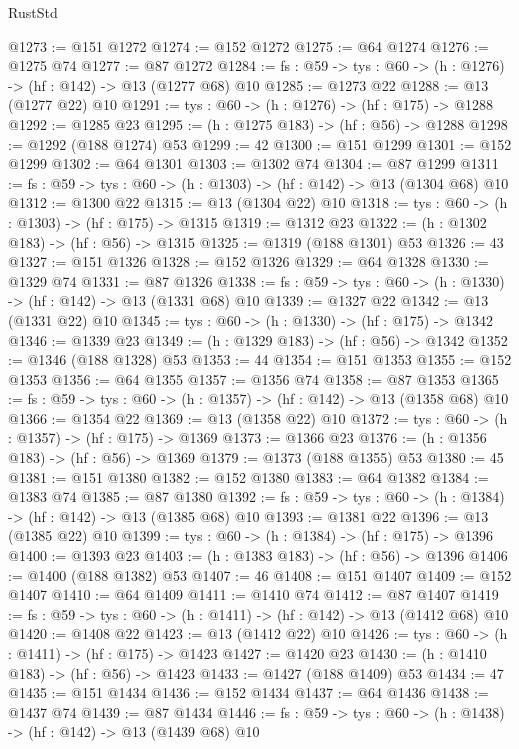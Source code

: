 \begin{lexlean}{RustStd}
\begin{coremodule}
@1273 := @151 @1272
@1274 := @152 @1272
@1275 := @64 @1274
@1276 := @1275 @74
@1277 := @87 @1272
@1284 := {fs : @59} -> {tys : @60} -> (h : @1276) -> (hf : @142) -> @13 (@1277 @68) @10
@1285 := @1273 @22
@1288 := @13 (@1277 @22) @10
@1291 := {tys : @60} -> (h : @1276) -> (hf : @175) -> @1288
@1292 := @1285 @23
@1295 := (h : @1275 @183) -> (hf : @56) -> @1288
@1298 := @1292 (@188 @1274) @53
@1299 := 42
@1300 := @151 @1299
@1301 := @152 @1299
@1302 := @64 @1301
@1303 := @1302 @74
@1304 := @87 @1299
@1311 := {fs : @59} -> {tys : @60} -> (h : @1303) -> (hf : @142) -> @13 (@1304 @68) @10
@1312 := @1300 @22
@1315 := @13 (@1304 @22) @10
@1318 := {tys : @60} -> (h : @1303) -> (hf : @175) -> @1315
@1319 := @1312 @23
@1322 := (h : @1302 @183) -> (hf : @56) -> @1315
@1325 := @1319 (@188 @1301) @53
@1326 := 43
@1327 := @151 @1326
@1328 := @152 @1326
@1329 := @64 @1328
@1330 := @1329 @74
@1331 := @87 @1326
@1338 := {fs : @59} -> {tys : @60} -> (h : @1330) -> (hf : @142) -> @13 (@1331 @68) @10
@1339 := @1327 @22
@1342 := @13 (@1331 @22) @10
@1345 := {tys : @60} -> (h : @1330) -> (hf : @175) -> @1342
@1346 := @1339 @23
@1349 := (h : @1329 @183) -> (hf : @56) -> @1342
@1352 := @1346 (@188 @1328) @53
@1353 := 44
@1354 := @151 @1353
@1355 := @152 @1353
@1356 := @64 @1355
@1357 := @1356 @74
@1358 := @87 @1353
@1365 := {fs : @59} -> {tys : @60} -> (h : @1357) -> (hf : @142) -> @13 (@1358 @68) @10
@1366 := @1354 @22
@1369 := @13 (@1358 @22) @10
@1372 := {tys : @60} -> (h : @1357) -> (hf : @175) -> @1369
@1373 := @1366 @23
@1376 := (h : @1356 @183) -> (hf : @56) -> @1369
@1379 := @1373 (@188 @1355) @53
@1380 := 45
@1381 := @151 @1380
@1382 := @152 @1380
@1383 := @64 @1382
@1384 := @1383 @74
@1385 := @87 @1380
@1392 := {fs : @59} -> {tys : @60} -> (h : @1384) -> (hf : @142) -> @13 (@1385 @68) @10
@1393 := @1381 @22
@1396 := @13 (@1385 @22) @10
@1399 := {tys : @60} -> (h : @1384) -> (hf : @175) -> @1396
@1400 := @1393 @23
@1403 := (h : @1383 @183) -> (hf : @56) -> @1396
@1406 := @1400 (@188 @1382) @53
@1407 := 46
@1408 := @151 @1407
@1409 := @152 @1407
@1410 := @64 @1409
@1411 := @1410 @74
@1412 := @87 @1407
@1419 := {fs : @59} -> {tys : @60} -> (h : @1411) -> (hf : @142) -> @13 (@1412 @68) @10
@1420 := @1408 @22
@1423 := @13 (@1412 @22) @10
@1426 := {tys : @60} -> (h : @1411) -> (hf : @175) -> @1423
@1427 := @1420 @23
@1430 := (h : @1410 @183) -> (hf : @56) -> @1423
@1433 := @1427 (@188 @1409) @53
@1434 := 47
@1435 := @151 @1434
@1436 := @152 @1434
@1437 := @64 @1436
@1438 := @1437 @74
@1439 := @87 @1434
@1446 := {fs : @59} -> {tys : @60} -> (h : @1438) -> (hf : @142) -> @13 (@1439 @68) @10

\end{coremodule}
\end{lexlean}
